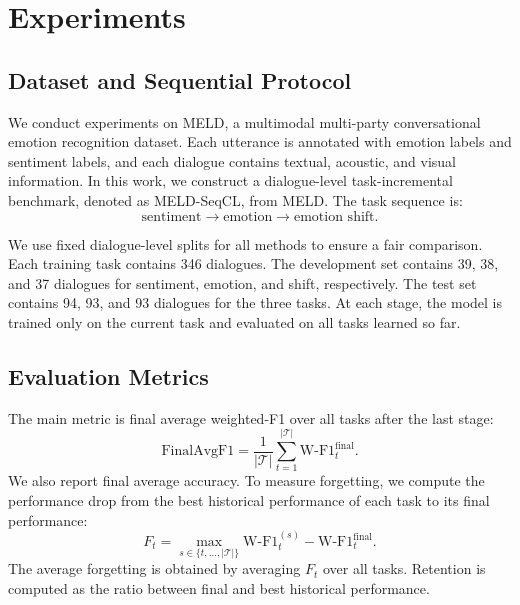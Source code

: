 \section{Experiments}
\label{sec:experiments}

\subsection{Dataset and Sequential Protocol}
\label{subsec:dataset_protocol}

We conduct experiments on MELD, a multimodal multi-party conversational emotion recognition dataset. Each utterance is annotated with emotion labels and sentiment labels, and each dialogue contains textual, acoustic, and visual information. In this work, we construct a dialogue-level task-incremental benchmark, denoted as MELD-SeqCL, from MELD. The task sequence is:
\begin{equation}
    \text{sentiment} \rightarrow \text{emotion} \rightarrow \text{emotion shift}.
\end{equation}

We use fixed dialogue-level splits for all methods to ensure a fair comparison. Each training task contains 346 dialogues. The development set contains 39, 38, and 37 dialogues for sentiment, emotion, and shift, respectively. The test set contains 94, 93, and 93 dialogues for the three tasks. At each stage, the model is trained only on the current task and evaluated on all tasks learned so far.

\subsection{Evaluation Metrics}
\label{subsec:metrics}

The main metric is final average weighted-F1 over all tasks after the last stage:
\begin{equation}
    \mathrm{FinalAvgF1}
    =
    \frac{1}{|\mathcal{T}|}
    \sum_{t=1}^{|\mathcal{T}|}
    \mathrm{W\mbox{-}F1}_{t}^{\mathrm{final}}.
\end{equation}
We also report final average accuracy. To measure forgetting, we compute the performance drop from the best historical performance of each task to its final performance:
\begin{equation}
    F_t =
    \max_{s\in\{t,\ldots,|\mathcal{T}|\}}
    \mathrm{W\mbox{-}F1}_{t}^{(s)}
    -
    \mathrm{W\mbox{-}F1}_{t}^{\mathrm{final}}.
\end{equation}
The average forgetting is obtained by averaging $F_t$ over all tasks. Retention is computed as the ratio between final and best historical performance.

